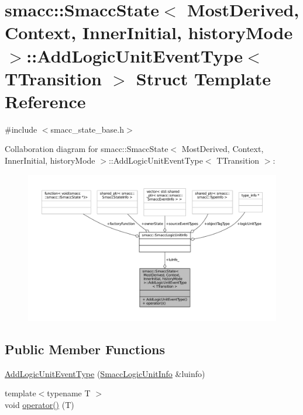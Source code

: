 \hypertarget{structsmacc_1_1SmaccState_1_1AddLogicUnitEventType}{}\section{smacc\+:\+:Smacc\+State$<$ Most\+Derived, Context, Inner\+Initial, history\+Mode $>$\+:\+:Add\+Logic\+Unit\+Event\+Type$<$ T\+Transition $>$ Struct Template Reference}
\label{structsmacc_1_1SmaccState_1_1AddLogicUnitEventType}


{\ttfamily \#include $<$smacc\+\_\+state\+\_\+base.\+h$>$}



Collaboration diagram for smacc\+:\+:Smacc\+State$<$ Most\+Derived, Context, Inner\+Initial, history\+Mode $>$\+:\+:Add\+Logic\+Unit\+Event\+Type$<$ T\+Transition $>$\+:
\nopagebreak
\begin{figure}[H]
\begin{center}
\leavevmode
\includegraphics[width=350pt]{structsmacc_1_1SmaccState_1_1AddLogicUnitEventType__coll__graph}
\end{center}
\end{figure}
\subsection*{Public Member Functions}
\begin{DoxyCompactItemize}
\item 
\hyperlink{structsmacc_1_1SmaccState_1_1AddLogicUnitEventType_a056b0caaa1a419fecfb36eccc42e9aa6}{Add\+Logic\+Unit\+Event\+Type} (\hyperlink{structsmacc_1_1SmaccLogicUnitInfo}{Smacc\+Logic\+Unit\+Info} \&luinfo)
\item 
{\footnotesize template$<$typename T $>$ }\\void \hyperlink{structsmacc_1_1SmaccState_1_1AddLogicUnitEventType_a8ed7e96e4922fbc8097a6ff078d70150}{operator()} (T)
\end{DoxyCompactItemize}
